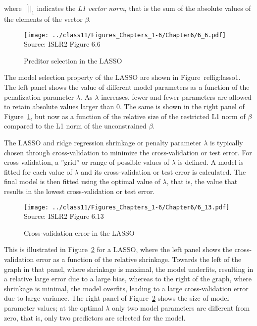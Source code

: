 \noindent where $||\dot||_1$ indicates the \emph{L1 vector norm}, that is the sum of the absolute values of the elements of the vector $\beta$.

\begin{figure}
\centering
\texttt{[image: ../class11/Figures\_Chapters\_1-6/Chapter6/6\_6.pdf]} \\

\scriptsize Source: ISLR2 Figure 6.6
\caption{Preditor selection in the LASSO}
\label{fig:lasso1}
\end{figure}

The model selection property of the LASSO are shown in Figure~ref{fig:lasso1}. The left panel shows the value of different model parameters as a function of the penalization parameter $\lambda$. As $\lambda$ increases, fewer and fewer parameters are allowed to retain absolute values larger than 0. The same is shown in the right panel of Figure~\ref{fig:lasso1}, but now as a function of the relative size of the restricted L1 norm of $\beta$ compared to the L1 norm of the unconstrained $\beta$.

The LASSO and ridge regression shrinkage or penalty parameter $\lambda$ is typically chosen through cross-validation to minimize the cross-validation or test error. For cross-validation, a ''grid'' or range of possible values of $\lambda$ is defined. A model is fitted for each value of $\lambda$ and its cross-validation or test error is calculated. The final model is then fitted using the optimal value of $\lambda$, that is, the value that results in the lowest cross-validation or test error.

\begin{figure}
\centering
\texttt{[image: ../class11/Figures\_Chapters\_1-6/Chapter6/6\_13.pdf]} \\

\scriptsize Source: ISLR2 Figure 6.13
\caption{Cross-validation error in the LASSO}
\label{fig:lasso2}
\end{figure}

This is illustrated in Figure~\ref{fig:lasso2} for a LASSO, where the left panel shows the cross-validation error as a function of the relative shrinkage. Towards the left of the graph in that panel, where shrinkage is maximal, the model underfits, resulting in a relative large error due to a large bias, whereas to the right of the graph, where shrinkage is minimal, the model overfits, leading to a large cross-validation error due to large variance. The right panel of Figure~\ref{fig:lasso2} shows the size of model parameter values; at the optimal $\lambda$ only two model parameters are different from zero, that is, only two predictors are selected for the model. 

